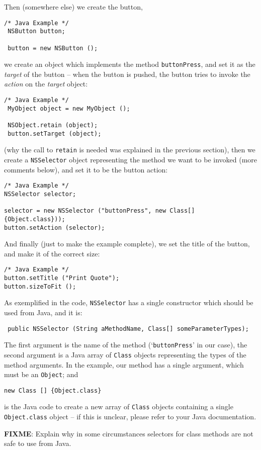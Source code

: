 Then (somewhere else) we create the button, 
\begin{verbatim}
/* Java Example */
 NSButton button;

 button = new NSButton ();
\end{verbatim}
we create an object which implements the method \texttt{buttonPress},
and set it as the \emph{target} of the button -- when the button is
pushed, the button tries to invoke the \emph{action} on the
\emph{target} object:
\begin{verbatim}
/* Java Example */
 MyObject object = new MyObject (); 

 NSObject.retain (object);
 button.setTarget (object);
\end{verbatim}
(why the call to \texttt{retain} is needed was explained in the
previous section), then we create a \texttt{NSSelector} object
representing the method we want to be invoked (more comments below),
and set it to be the button action:
\begin{verbatim}
/* Java Example */
NSSelector selector;

selector = new NSSelector ("buttonPress", new Class[] {Object.class}));
button.setAction (selector);
\end{verbatim}
And finally (just to make the example complete), we set the title of
the button, and make it of the correct size:
\begin{verbatim}
/* Java Example */
button.setTitle ("Print Quote");
button.sizeToFit ();
\end{verbatim}

As exemplified in the code, \texttt{NSSelector} has a single
constructor which should be used from Java, and it is:
\begin{verbatim}
 public NSSelector (String aMethodName, Class[] someParameterTypes);
\end{verbatim}
The first argument is the name of the method (`\texttt{buttonPress}'
in our case), the second argument is a Java array of \texttt{Class}
objects representing the types of the method arguments.  In the
example, our method has a single argument, which must be an 
\texttt{Object}; and 
\begin{verbatim}
new Class [] {Object.class}
\end{verbatim}
is the Java code to create a new array of \texttt{Class} objects
containing a single \texttt{Object.class} object -- if this is
unclear, please refer to your Java documentation.

{\bf FIXME}: Explain why in some circumstances selectors for class
methods are not safe to use from Java.

